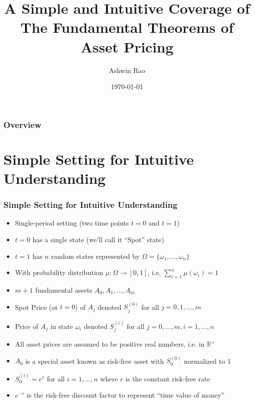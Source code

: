 \documentclass{beamer}
\title[Fundamental Theorems of Asset Pricing]{A Simple and Intuitive Coverage of \\ The Fundamental Theorems of Asset Pricing} %
\author{Ashwin Rao} %
\institute[Stanford] %
{
ICME, Stanford University
}
\date{\today} %
\begin{document}
\begin{frame}
\titlepage %
\end{frame}

\begin{frame}
\frametitle{Overview} %
\tableofcontents %
\end{frame}

\section{Simple Setting for Intuitive Understanding}

\begin{frame}
\frametitle{Simple Setting for Intuitive Understanding}
\begin{itemize}
\item Single-period setting (two time points $t=0$ and $t=1$)
\item $t=0$ has a single state (we'll call it ``Spot'' state)
\item $t=1$ has $n$ random states represented by $\Omega = \{\omega_1, \ldots, \omega_n\}$
\item With probability distribution $\mu: \Omega \rightarrow [0,1]$, i.e, $\sum_{i=1}^n \mu(\omega_i) = 1$
\item $m + 1$ fundamental assets $A_0, A_1, \ldots, A_m$
\item Spot Price (at $t=0$) of $A_j$ denoted $S_j^{(0)}$ for all $j = 0, 1, \ldots, m$
\item Price of $A_j$ in state $\omega_i$ denoted $S_j^{(i)}$ for all $j = 0, \ldots, m, i = 1, \ldots, n$
\item All asset prices are assumed to be positive real numbers, i.e. in $\mathbb{R}^+$
\item $A_0$ is a special asset known as risk-free asset with $S_0^{(0)}$ normalized to 1
\item $S_0^{(i)}= e^r$ for all $i = 1, \ldots, n$ where $r$ is the constant risk-free rate
\item $e^{-r}$ is the risk-free discount factor to represent ``time value of money''
\end{itemize}
\end{frame}
\end{document}

